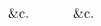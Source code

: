 \documentclass[11pt,preview]{standalone}
\begin{document}
\[\begin{aligned}
         & \hspace{5ex}\text{\&c.}                                                                                                                                                                                                                                                                                                                                                                                                                                                                                                                                                                                                                                                                                                                                                                                                                                                   &  & \hspace{5ex}\text{\&c.}                                                                                                                                                                                                                                                                                                                                                                                                                                                                                                                                                                                                                                                                                                                                                                                                                                                                                                                                                                          \\

\end{aligned}\]
\end{document}
